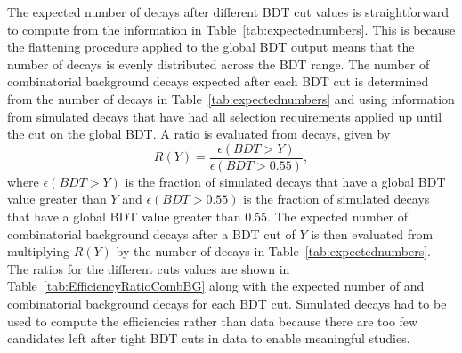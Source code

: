 The expected number of \bsmumu decays after different BDT cut values is straightforward to compute from the information in Table~\ref{tab:expectednumbers}. This is because  the flattening procedure applied to the global BDT output means that the number of \bsmumu decays is evenly distributed across the BDT range. The number of combinatorial background decays expected after each BDT cut is determined from the number of decays in Table~\ref{tab:expectednumbers} and using information from simulated \bbbarmumux decays that have had all \el selection requirements applied up until the cut on the global BDT. 
A ratio is evaluated from \bbbarmumux decays, given by
\begin{equation}
R(Y) = \frac{\epsilon(BDT > Y)}{\epsilon(BDT > 0.55)},
\end{equation}
where $\epsilon(BDT > Y)$ is the fraction of simulated \bbbarmumux decays that have a global BDT value greater than $Y$ and $\epsilon(BDT > 0.55)$ is the fraction of simulated \bbbarmumux decays that have a global BDT value greater than 0.55. The expected number of combinatorial background decays after a BDT cut of $Y$ is then evaluated from multiplying $R(Y)$ by the number of decays in Table~\ref{tab:expectednumbers}.
The ratios for the different cuts values are shown in Table~\ref{tab:EfficiencyRatioCombBG} along with the expected number of \bsmumu and combinatorial background decays for each BDT cut. Simulated decays had to be used to compute the efficiencies rather than data because there are too few candidates left after tight BDT cuts in  data to enable meaningful studies. 







